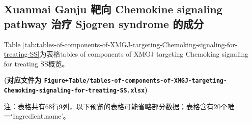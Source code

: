 \documentclass[
]{article}
\begin{document}
\hypertarget{xuanmai-ganju-ux9776ux5411-chemokine-signaling-pathway-ux6cbbux7597-sjogren-syndrome-ux7684ux6210ux5206}{%
\subsection{Xuanmai Ganju 靶向 Chemokine signaling pathway 治疗 Sjogren syndrome 的成分}\label{xuanmai-ganju-ux9776ux5411-chemokine-signaling-pathway-ux6cbbux7597-sjogren-syndrome-ux7684ux6210ux5206}}

Table \ref{tab:tables-of-components-of-XMGJ-targeting-Chemoking-signaling-for-treating-SS}为表格tables of components of XMGJ targeting Chemoking signaling for treating SS概览。

\textbf{(对应文件为 \texttt{Figure+Table/tables-of-components-of-XMGJ-targeting-Chemoking-signaling-for-treating-SS.xlsx})}

\begin{center}\begin{tcolorbox}[colback=gray!10, colframe=gray!50, width=0.9\linewidth, arc=1mm, boxrule=0.5pt]注：表格共有68行9列，以下预览的表格可能省略部分数据；表格含有20个唯一`Ingredient.name'。
\end{tcolorbox}
\end{center}
\end{document}
